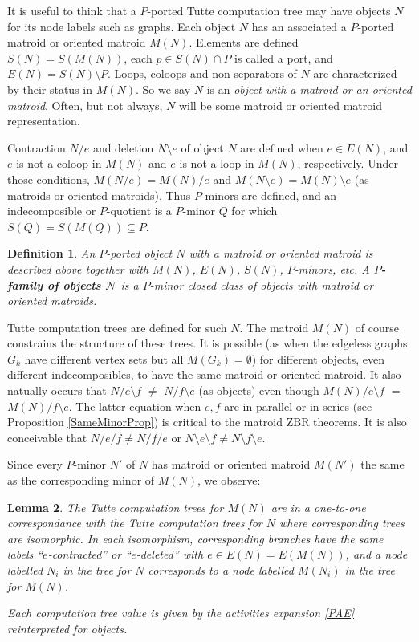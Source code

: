 \documentclass[12pt,leqno]{amsart}
\newtheorem{lem}{Lemma}
\newtheorem{definition}[lem]{Definition}
\theoremstyle{remark}
\begin{document}
It is useful to think that a $P$-ported Tutte computation tree may have
objects $N$ for its node labels such as graphs.
Each object $N$ has an associated
a $P$-ported matroid or oriented matroid $M(N)$.
Elements are defined $S(N)=S(M(N))$, 
each $p\in S(N)\cap P$ is called a port, and
$E(N)=S(N)\setminus P$.  Loops, coloops and non-separators of $N$
are characterized by their status in $M(N)$.  So we
say $N$ is an \emph{object with a matroid or an oriented matroid}.
Often, but not always, $N$ will be some matroid or oriented
matroid representation.


Contraction $N/e$ and deletion $N\setminus e$ 
of object $N$ are defined when $e\in E(N)$, and
$e$ is not a coloop in $M(N)$ and 
$e$ is not a loop in $M(N)$, respectively.
Under those conditions, $M(N/e)=M(N)/e$ and 
$M(N\setminus e)=M(N)\setminus e$ (as matroids or
oriented matroids).
Thus $P$-minors are defined,
and an indecomposible or $P$-quotient
is a $P$-minor $Q$ for which $S(Q)=S(M(Q))\subseteq P$.

\begin{definition}
\label{OMOMdef}
An $P$-ported object $N$ with a matroid or oriented matroid 
is described above together with $M(N)$, $E(N)$, $S(N)$,
$P$-minors, etc.
A \textbf{$P$-family of objects $\mathcal{N}$}
is a $P$-minor closed class of 
objects with matroid or oriented matroids.
\end{definition}

Tutte computation trees are defined for such $N$.
The matroid $M(N)$ of course
constrains the structure of these trees.  
It is possible
(as when the edgeless graphs $G_k$ have different vertex sets but all
$M(G_k)=\emptyset$)
for different objects, 
even different indecomposibles, to have the same 
matroid or oriented matroid.  It also natually occurs 
that
$N/e\setminus f$ $\neq$ 
$N/f\setminus e$ (as objects) even though 
$M(N)/e\setminus f$ $=$ 
$M(N)/f\setminus e$.  The latter equation when 
$e,f$ are in parallel or in series (see Proposition
\ref{SameMinorProp}) is critical to the matroid ZBR theorems.
It is also conceivable that $N/e/f\neq N/f/e$ or
$N\setminus e\setminus f\neq N\setminus f\setminus e$.

Since every $P$-minor $N'$ of $N$ has matroid
or oriented matroid $M(N')$ the same as the corresponding
minor of $M(N)$, we observe:

\begin{lem}
\label{ObjectTreeValueLemma}
The Tutte computation trees for $M(N)$ are in a one-to-one
correspondance with the 
Tutte computation trees for $N$ 
where corresponding trees are isomorphic.  In each
isomorphism,
corresponding
branches have the same labels ``$e$-contracted'' or
``$e$-deleted'' with $e\in E(N)=E(M(N))$, and a node
labelled $N_i$ in the tree for $N$ corresponds to 
a node labelled $M(N_i)$ in the tree for $M(N)$.

Each computation tree value is given by
the activities expansion \eqref{PAE} reinterpreted for
objects.
\end{lem}
\end{document}
